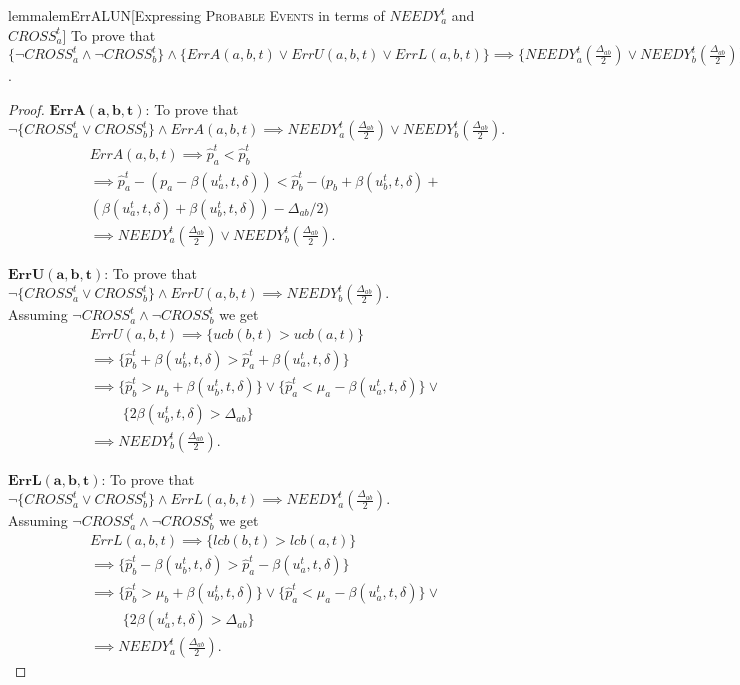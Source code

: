 \begin{restatable}{lemma}{lemErrALUN}[Expressing \textsc{Probable Events} in terms of $NEEDY_a^t$ and $CROSS_a^t$]
\label{lem:ErrALUN}
To prove that $\{\neg  CROSS_a^t \wedge \neg CROSS_b^t\} \wedge \{ErrA(a,b,t) \vee ErrU(a,b,t) \vee ErrL(a,b,t)\} \implies \{NEEDY_a^t\left(\frac{\Delta_{ab}}{2}\right) \vee NEEDY_b^t\left(\frac{\Delta_{ab}}{2}\right) \}$.
\end{restatable}
\begin{proof}
$\mathbf{ErrA(a,b,t)}$: To prove that $\neg \{CROSS_a^t \vee CROSS_b^t\} \wedge ErrA(a,b,t) \implies  NEEDY_a^t\left(\frac{\Delta_{ab}}{2}\right) \vee NEEDY_b^t\left(\frac{\Delta_{ab}}{2}\right)$.
      \begin{align*}
      & ErrA(a,b,t) \implies \hat{p}_a^t < \hat{p}_b^t \\
      & \implies \hat{p}_a^t - (p_a - \beta(u_a^t,t,\delta)) < \hat{p}_b^t - (p_b + \beta(u_b^t,t,\delta) +\\
      & (\beta(u_a^t,t,\delta) + \beta(u_b^t,t,\delta)) - \Delta_{ab}/2)\\
      &\implies  NEEDY_a^t\left(\frac{\Delta_{ab}}{2}\right) \vee NEEDY_b^t\left(\frac{\Delta_{ab}}{2}\right). 
      \end{align*}
    

$\mathbf{ErrU(a,b,t)}$: To prove that $\neg \{CROSS_a^t \vee CROSS_b^t\} \wedge ErrU(a,b,t) \implies NEEDY_b^t\left(\frac{\Delta_{ab}}{2}\right)$.\\
Assuming $\neg CROSS_a^t \wedge \neg CROSS_b^t$ we get
\begin{align*}
& ErrU(a,b,t) \implies \{ucb(b,t) > ucb(a,t)\}\\
& \implies \{\hat{p}_b^t + \beta(u_b^t,t,\delta)> \hat{p}_a^t + \beta(u_a^t,t,\delta)\}\\
& \implies \{\hat{p}_b^t > \mu_b + \beta(u_b^t,t,\delta)\} \vee \{\hat{p}_a^t < \mu_a - \beta(u_a^t,t,\delta)\}  \vee\\ 
& \hspace{28pt} \{2\beta(u_b^t,t,\delta) > \Delta_{ab}\}\\
& \implies NEEDY_b^t\left(\frac{\Delta_{ab}}{2}\right).
\end{align*}
    

$\mathbf{ErrL(a,b,t)}$: To prove that $\neg \{CROSS_a^t \vee CROSS_b^t\} \wedge ErrL(a,b,t) \implies NEEDY_a^t\left(\frac{\Delta_{ab}}{2}\right)$.\\
Assuming $\neg CROSS_a^t \wedge \neg CROSS_b^t$ we get
\begin{align*}
& ErrL(a,b,t) \implies \{lcb(b,t) > lcb(a,t)\}\\
& \implies \{\hat{p}_b^t - \beta(u_b^t,t,\delta)> \hat{p}_a^t - \beta(u_a^t,t,\delta)\}\\
& \implies \{\hat{p}_b^t > \mu_b + \beta(u_b^t,t,\delta)\} \vee \{\hat{p}_a^t < \mu_a - \beta(u_a^t,t,\delta)\}  \vee\\ 
& \hspace{28pt} \{2\beta(u_a^t,t,\delta) > \Delta_{ab}\}\\
& \implies NEEDY_a^t\left(\frac{\Delta_{ab}}{2}\right).
\end{align*}
\end{proof}
